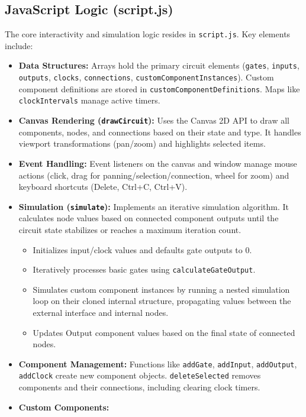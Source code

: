 \documentclass[11pt, a4paper]{article}
\begin{document}
\subsection{JavaScript Logic (script.js)}
The core interactivity and simulation logic resides in \texttt{script.js}. Key elements include:
\begin{itemize}
    \item \textbf{Data Structures:} Arrays hold the primary circuit elements (\texttt{gates}, \texttt{inputs}, \texttt{outputs}, \texttt{clocks}, \texttt{connections}, \texttt{customComponentInstances}). Custom component definitions are stored in \texttt{customComponentDefinitions}. Maps like \texttt{clockIntervals} manage active timers.
    \item \textbf{Canvas Rendering (\texttt{drawCircuit}):} Uses the Canvas 2D API to draw all components, nodes, and connections based on their state and type. It handles viewport transformations (pan/zoom) and highlights selected items.
    \item \textbf{Event Handling:} Event listeners on the canvas and window manage mouse actions (click, drag for panning/selection/connection, wheel for zoom) and keyboard shortcuts (Delete, Ctrl+C, Ctrl+V).
    \item \textbf{Simulation (\texttt{simulate}):} Implements an iterative simulation algorithm. It calculates node values based on connected component outputs until the circuit state stabilizes or reaches a maximum iteration count. 
        \begin{itemize}
            \item Initializes input/clock values and defaults gate outputs to 0.
            \item Iteratively processes basic gates using \texttt{calculateGateOutput}.
            \item Simulates custom component instances by running a nested simulation loop on their cloned internal structure, propagating values between the external interface and internal nodes.
            \item Updates Output component values based on the final state of connected nodes.
        \end{itemize}
    \item \textbf{Component Management:} Functions like \texttt{addGate}, \texttt{addInput}, \texttt{addOutput}, \texttt{addClock} create new component objects. \texttt{deleteSelected} removes components and their connections, including clearing clock timers.
    \item \textbf{Custom Components:} 

\end{itemize}
\end{document}

